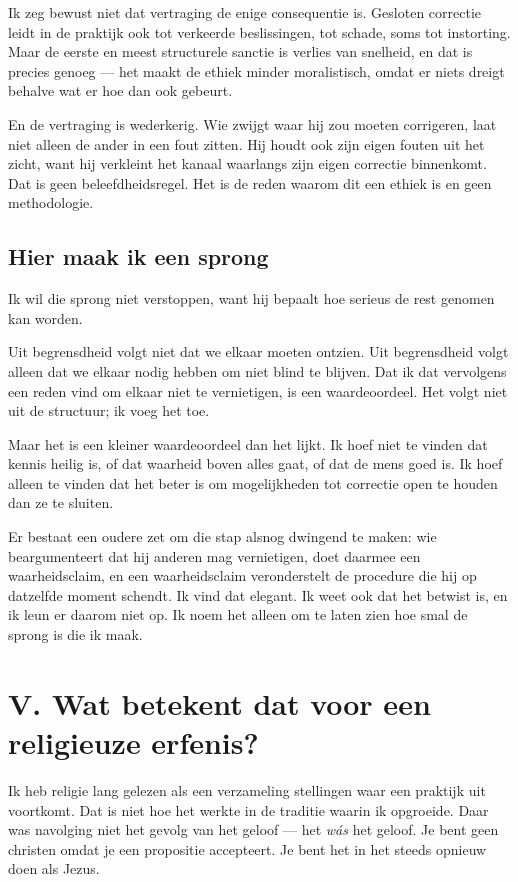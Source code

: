 \documentclass[11pt,a4paper]{article}
\begin{document}
Ik zeg bewust niet dat vertraging de enige consequentie is. Gesloten correctie leidt in de praktijk ook tot verkeerde beslissingen, tot schade, soms tot instorting. Maar de eerste en meest structurele sanctie is verlies van snelheid, en dat is precies genoeg --- het maakt de ethiek minder moralistisch, omdat er niets dreigt behalve wat er hoe dan ook gebeurt.

En de vertraging is wederkerig. Wie zwijgt waar hij zou moeten corrigeren, laat niet alleen de ander in een fout zitten. Hij houdt ook zijn eigen fouten uit het zicht, want hij verkleint het kanaal waarlangs zijn eigen correctie binnenkomt. Dat is geen beleefdheidsregel. Het is de reden waarom dit een ethiek is en geen methodologie.

\subsection*{Hier maak ik een sprong}

Ik wil die sprong niet verstoppen, want hij bepaalt hoe serieus de rest genomen kan worden.

Uit begrensdheid volgt niet dat we elkaar moeten ontzien. Uit begrensdheid volgt alleen dat we elkaar nodig hebben om niet blind te blijven. Dat ik dat vervolgens een reden vind om elkaar niet te vernietigen, is een waardeoordeel. Het volgt niet uit de structuur; ik voeg het toe.

Maar het is een kleiner waardeoordeel dan het lijkt. Ik hoef niet te vinden dat kennis heilig is, of dat waarheid boven alles gaat, of dat de mens goed is. Ik hoef alleen te vinden dat het beter is om mogelijkheden tot correctie open te houden dan ze te sluiten.

Er bestaat een oudere zet om die stap alsnog dwingend te maken: wie beargumenteert dat hij anderen mag vernietigen, doet daarmee een waarheidsclaim, en een waarheidsclaim veronderstelt de procedure die hij op datzelfde moment schendt. Ik vind dat elegant. Ik weet ook dat het betwist is, en ik leun er daarom niet op. Ik noem het alleen om te laten zien hoe smal de sprong is die ik maak.

\section*{V. Wat betekent dat voor een religieuze erfenis?}

Ik heb religie lang gelezen als een verzameling stellingen waar een praktijk uit voortkomt. Dat is niet hoe het werkte in de traditie waarin ik opgroeide. Daar was navolging niet het gevolg van het geloof --- het \textit{wás} het geloof. Je bent geen christen omdat je een propositie accepteert. Je bent het in het steeds opnieuw doen als Jezus.
\end{document}
